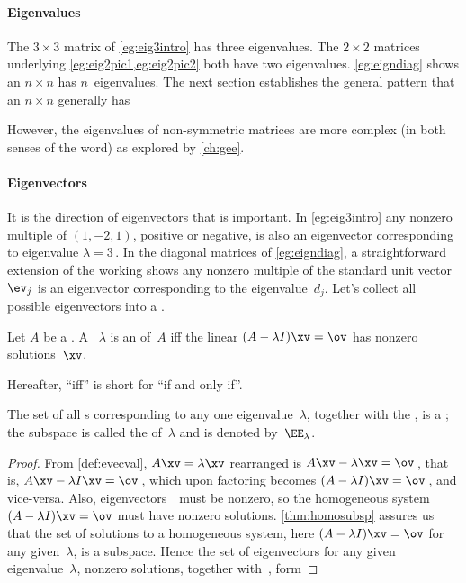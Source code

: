 \paragraph{Eigenvalues}
The \(3\times 3\) matrix of \cref{eg:eig3intro} has three eigenvalues.
The \(2\times2\) matrices underlying \cref{eg:eig2pic1,eg:eig2pic2} both have two eigenvalues.
\cref{eg:eigndiag} shows an \(n\times n\)  has \(n\)~eigenvalues.
The next section establishes the general pattern that an \(n\times n\) \emph{} generally has 

However, the eigenvalues of non-symmetric matrices are more complex (in both senses of the word) as explored by \cref{ch:gee}.

\paragraph{Eigenvectors}
It is the direction of eigenvectors that is important.
In \cref{eg:eig3intro} any nonzero multiple of \((1,-2,1)\), positive or negative, is also an eigenvector corresponding to eigenvalue \(\lambda=3\)\,.
In the diagonal matrices of \cref{eg:eigndiag}, a straightforward extension of the working shows any nonzero multiple of the standard unit vector~\(\ev_j\) is an eigenvector corresponding to the eigenvalue~\(d_j\).
Let's collect all possible eigenvectors into a . 


\begin{theorem} \label{thm:espacedef} 
Let \(A\) be a . 
A ~\(\lambda\) is an  of~\(A\) iff the  linear  \((A-\lambda I)\xv=\ov\) has nonzero solutions~\(\xv\).  
\begin{aside}
Hereafter, ``iff'' is short for ``if and only if''.
\end{aside}%
The set of all s corresponding to any one eigenvalue~\(\lambda\), together with the , is a ; the subspace is called the  of~\(\lambda\) and is denoted by~\(\EE_\lambda\).
\end{theorem}



\begin{proof} 
From \cref{def:evecval},  \(A\xv=\lambda\xv\)  rearranged is \(A\xv-\lambda\xv=\ov\)\,, that is, \(A\xv-\lambda I\xv=\ov\)\,, which upon factoring becomes \((A-\lambda I)\xv=\ov\)\,, and vice-versa.  
Also, eigenvectors~\xv\ must be nonzero, so the homogeneous system \((A-\lambda I)\xv=\ov\) must have nonzero solutions.
\cref{thm:homosubsp} assures us that the set of solutions to a homogeneous system, here \((A-\lambda I)\xv=\ov\) for any given~\(\lambda\), is a subspace. 
Hence the set of eigenvectors for any given eigenvalue~\(\lambda\), nonzero solutions, together with~\ov, form 
\end{proof}


